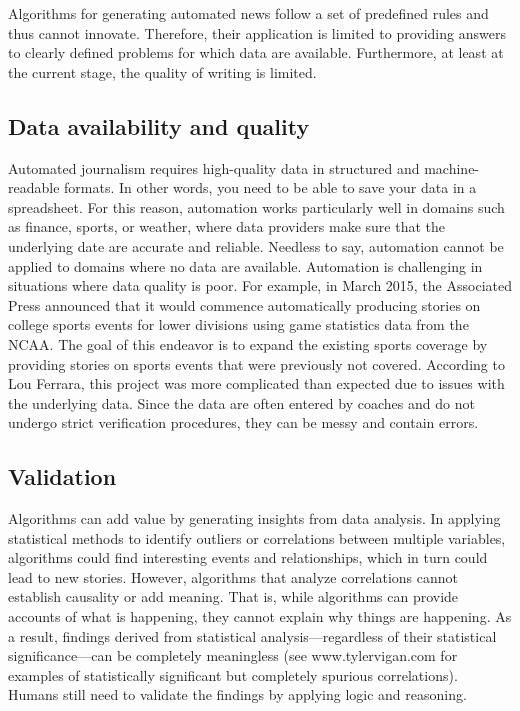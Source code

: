 \documentclass[notoc, symmetric, nobib, nols]{towcenter-guideto-book}
\begin{document}
Algorithms for generating automated news follow a set of predefined rules and thus cannot innovate. Therefore, their application is limited to providing answers to clearly defined problems for which data are available. Furthermore, at least at the current stage, the quality of writing is limited.  

\subsection{Data availability and quality}

Automated journalism requires high-quality data in structured and machine-readable formats. In other words, you need to be able to save your data in a spreadsheet. For this reason, automation works particularly well in domains such as finance, sports, or weather, where data providers make sure that the underlying date are accurate and reliable. Needless to say, automation cannot be applied to domains where no data are available. Automation is challenging in situations where data quality is poor. For example, in March 2015, the Associated Press announced that it would commence automatically producing stories on college sports events for lower divisions using game statistics data from the NCAA. The goal of this endeavor is to expand the existing sports coverage by providing stories on sports events that were previously not covered. According to Lou Ferrara, this project was more complicated than expected due to issues with the underlying data. Since the data are often entered by coaches and do not undergo strict verification procedures, they can be messy and contain errors. 

\subsection{Validation}

Algorithms can add value by generating insights from data analysis. In applying statistical methods to identify outliers or correlations between multiple variables, algorithms could find interesting events and relationships, which in turn could lead to new stories. However, algorithms that analyze correlations cannot establish causality or add meaning. That is, while algorithms can provide accounts of what is happening, they cannot explain why things are happening.\autocite{lazer14} As a result, findings derived from statistical analysis---regardless of their statistical significance---can be completely meaningless (see www.tylervigan.com for examples of statistically significant but completely spurious correlations). Humans still need to validate the findings by applying logic and reasoning.\autocite{latar15}
\end{document}
